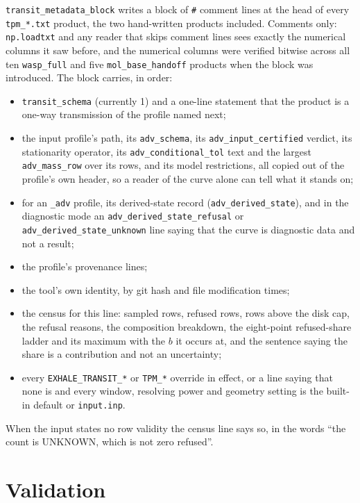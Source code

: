 \documentclass[english,a4paper]{my_memo}
\begin{document}
\verb|transit_metadata_block| writes a block of \verb|#| comment lines at
the head of every \verb|tpm_*.txt| product, the two hand-written products
included. Comments only: \verb|np.loadtxt| and any reader that skips
comment lines sees exactly the numerical columns it saw before, and the
numerical columns were verified bitwise across all ten \verb|wasp_full| and
five \verb|mol_base_handoff| products when the block was introduced. The
block carries, in order:

\begin{itemize}
  \item \verb|transit_schema| (currently 1) and a one-line statement that
    the product is a one-way transmission of the profile named next;
  \item the input profile's path, its \verb|adv_schema|, its
    \verb|adv_input_certified| verdict, its stationarity operator, its
    \verb|adv_conditional_tol| text and the largest \verb|adv_mass_row| over
    its rows, and its model restrictions, all copied out of the profile's
    own header, so a reader of the curve alone can tell what it stands on;
  \item for an \verb|_adv| profile, its derived-state record
    (\verb|adv_derived_state|), and in the diagnostic mode an
    \verb|adv_derived_state_refusal| or \verb|adv_derived_state_unknown| line
    saying that the curve is diagnostic data and not a result;
  \item the profile's provenance lines;
  \item the tool's own identity, by git hash and file modification times;
  \item the census for this line: sampled rows, refused rows, rows above the
    disk cap, the refusal reasons, the composition breakdown, the
    eight-point refused-share ladder and its maximum with the $b$ it occurs
    at, and the sentence saying the share is a contribution and not an
    uncertainty;
  \item every \verb|EXHALE_TRANSIT_*| or \verb|TPM_*| override in effect,
    or a line saying that none is and every window, resolving power and
    geometry setting is the built-in default or \verb|input.inp|.
\end{itemize}

When the input states no row validity the census line says so, in the words
``the count is UNKNOWN, which is not zero refused''.

\section{Validation}
\end{document}
